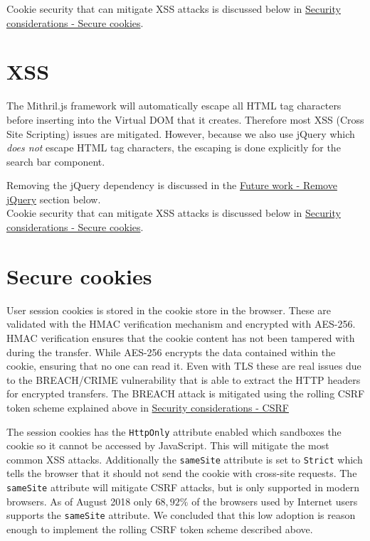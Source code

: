 \documentclass[12pt,a4paper]{report}
\begin{document}
Cookie security that can mitigate XSS attacks is discussed below in \hyperref[subsec:secure-cookies]{Security considerations - Secure cookies}.

\section{XSS}
The Mithril.js framework will automatically escape all HTML tag characters before inserting into the Virtual DOM that it creates\cite{mithril-trust}. Therefore most XSS (Cross Site Scripting) issues are mitigated. However, because we also use jQuery which \textit{does not} escape HTML tag characters, the escaping is done explicitly for the search bar component.

Removing the jQuery dependency is discussed in the \hyperref[subsec:remove-jquery]{Future work - Remove jQuery} section below.\\
Cookie security that can mitigate XSS attacks is discussed below in \hyperref[subsec:secure-cookies]{Security considerations - Secure cookies}.

\section{Secure cookies}
\label{subsec:secure-cookies}
User session cookies is stored in the cookie store in the browser. These are validated with the HMAC verification mechanism and encrypted with AES-256. HMAC verification ensures that the cookie content has not been tampered with during the transfer\cite{fips-198}. While AES-256 encrypts the data contained within the cookie, ensuring that no one can read it\cite{fips-197}. Even with TLS these are real issues due to the BREACH/CRIME vulnerability that is able to extract the HTTP headers for encrypted transfers\cite{breach}. The BREACH attack is mitigated using the rolling CSRF token scheme explained above in \hyperref[subsec:csrf]{Security considerations - CSRF}

The session cookies has the \texttt{HttpOnly} attribute enabled which sandboxes the cookie so it cannot be accessed by JavaScript. This will mitigate the most common XSS attacks\cite{owasp-httponly}. Additionally the \texttt{sameSite} attribute is set to \texttt{Strict} which tells the browser that it should not send the cookie with cross-site requests\cite{owasp-samesite}. The \texttt{sameSite} attribute will mitigate CSRF attacks, but is only supported in modern browsers. As of August 2018 only $68,92 \%$ of the browsers used by Internet users supports the \texttt{sameSite} attribute\cite{owasp-samesite-support}. We concluded that this low adoption is reason enough to implement the rolling CSRF token scheme described above.
\end{document}
